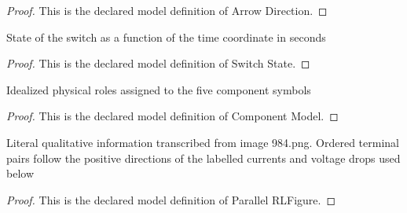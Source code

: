 \begin{proof}
  This is the declared model definition of Arrow Direction.
\end{proof}
\begin{definition}
  \label{def:physics:phyx-mini-0984:phyxminiproblems-problemphyxmini0984-switchstate}
  State of the switch as a function of the time coordinate in seconds
\end{definition}
\begin{proof}
  This is the declared model definition of Switch State.
\end{proof}
\begin{definition}
  \label{def:physics:phyx-mini-0984:phyxminiproblems-problemphyxmini0984-componentmodel}
  Idealized physical roles assigned to the five component symbols
\end{definition}
\begin{proof}
  This is the declared model definition of Component Model.
\end{proof}
\begin{definition}
  \label{def:physics:phyx-mini-0984:phyxminiproblems-problemphyxmini0984-parallelrlfigure}
  Literal qualitative information transcribed from image 984.png. Ordered terminal pairs follow the positive directions of the labelled currents and voltage drops used below
\end{definition}
\begin{proof}
  This is the declared model definition of Parallel RLFigure.
\end{proof}
